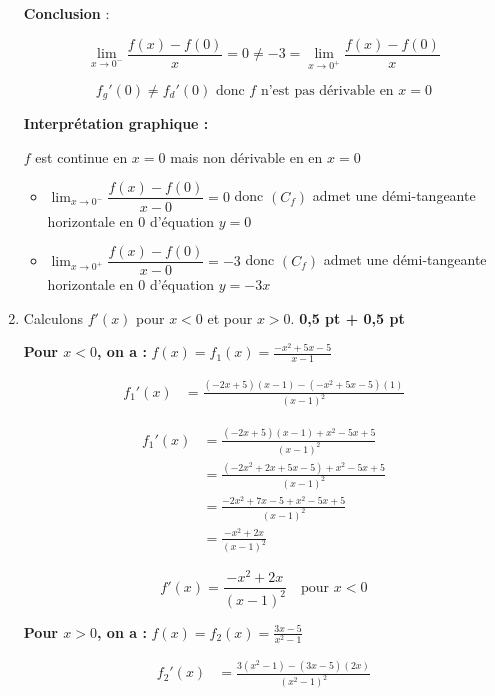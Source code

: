 \documentclass[12pt,a4paper]{article}
\begin{document}
\begin{enumerate}
\textbf{Conclusion} :

\[
\lim_{x \to 0^-} \frac{f(x) - f(0)}{x} = 0 \neq -3 = \lim_{x \to 0^+} \frac{f(x) - f(0)}{x}
\]

\begin{resultbox}
\[
\boxed{f_{g}'(0)\neq f_{d}'(0) \text{ donc }  f \text{ n’est pas dérivable en } x = 0}
\]
\end{resultbox}

\textbf{Interprétation graphique :}

\( f \) est continue en \( x = 0 \) mais non dérivable en en \( x = 0 \)

\begin{itemize}
 \item \( \lim_{x \to 0^-}\dfrac{f(x) - f(0)}{x - 0} = 0 \) donc \( (C_f) \) admet une démi-tangeante horizontale en \( 0\) d'équation \( y = 0 \)
 \item \( \lim_{x \to 0^+}\dfrac{f(x) - f(0)}{x - 0} = -3 \) donc \( (C_f) \) admet une démi-tangeante horizontale en \( 0 \) d'équation \( y = -3x \)
\end{itemize} 
    
    
    \item Calculons \( f'(x) \) pour \( x < 0 \) et pour \( x > 0 \). \hfill \textbf{0{,}5 pt + 0{,}5 pt}

\textbf{Pour \( x < 0 \), on a :} \( f(x) = f_1(x) = \frac{-x^2 + 5x - 5}{x - 1} \)

\[
\begin{aligned}
f_1'(x) &= \frac{(-2x + 5)(x - 1) - (-x^2 + 5x - 5)(1)}{(x - 1)^2}
\end{aligned}
\]

\[
\begin{aligned}
f_1'(x) &= \frac{(-2x + 5)(x - 1) + x^2 - 5x + 5}{(x - 1)^2} \\
&= \frac{(-2x^2 + 2x + 5x - 5) + x^2 - 5x + 5}{(x - 1)^2} \\
&= \frac{-2x^2 + 7x - 5 + x^2 - 5x + 5}{(x - 1)^2} \\
&= \frac{-x^2 + 2x}{(x - 1)^2}
\end{aligned}
\]

\[
\boxed{f'(x) = \dfrac{-x^2 + 2x}{(x - 1)^2} \quad \text{pour } x < 0}
\]

\bigskip

\textbf{Pour \( x > 0 \), on a :} \( f(x) = f_2(x) = \frac{3x - 5}{x^2 - 1} \)

\[
\begin{aligned}
f_2'(x) &= \frac{3(x^2 - 1) - (3x - 5)(2x)}{(x^2 - 1)^2}
\end{aligned}
\]


\end{enumerate}
\end{document}

